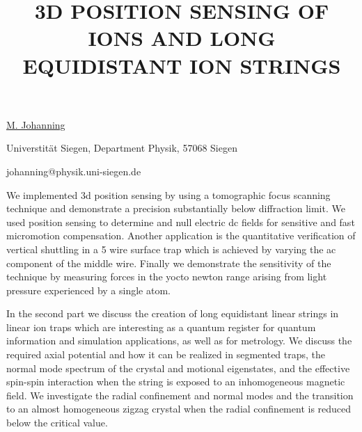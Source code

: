 \title{3D POSITION SENSING OF IONS AND LONG EQUIDISTANT ION STRINGS}

\underline{M. Johanning} 

{\normalsize{\vspace{-4mm}
Universtit\"{a}t Siegen,
Department Physik,
57068 Siegen

\email johanning@physik.uni-siegen.de}}

We implemented 3d position sensing by using a tomographic focus scanning
technique and demonstrate a precision substantially below diffraction
limit. We used position sensing to determine and null electric dc fields
for sensitive and fast micromotion compensation. Another application is
the quantitative verification of vertical shuttling in a 5 wire surface
trap which is achieved by varying the ac component of the middle wire.
Finally we demonstrate the sensitivity of the technique by measuring
forces in the yocto newton range arising from light pressure experienced
by a single atom.

In the second part we discuss the creation of long equidistant linear
strings in linear ion traps which are interesting as a quantum register
for quantum information and simulation applications, as well as for
metrology. We discuss the required axial potential and how it can be
realized in segmented traps, the normal mode spectrum of the crystal and
motional eigenstates, and the effective spin-spin interaction when the
string is exposed to an inhomogeneous magnetic field. We investigate the
radial confinement and normal modes and the transition to an almost
homogeneous zigzag crystal when the radial confinement is reduced below
the critical value.



\vspace{\baselineskip}
